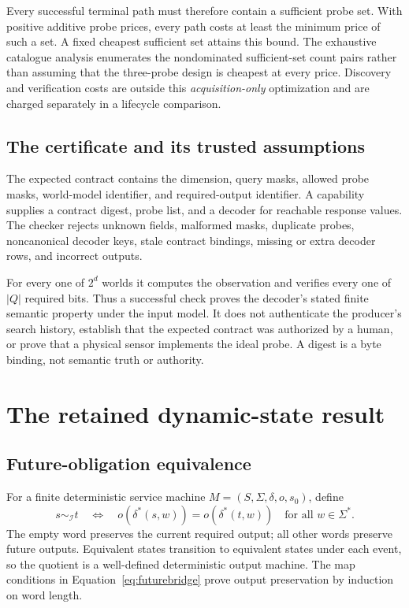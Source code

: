 \documentclass[11pt,letterpaper]{article}
\newcommand{\I}{\mathcal I}\newcommand{\A}{\mathcal A}
\theoremstyle{remark}\newtheorem{remark}{Remark}[section]
\begin{document}
Every successful terminal path must therefore contain a sufficient probe set. With positive additive probe prices, every path costs at least the minimum price of such a set. A fixed cheapest sufficient set attains this bound. The exhaustive catalogue analysis enumerates the nondominated sufficient-set count pairs rather than assuming that the three-probe design is cheapest at every price. Discovery and verification costs are outside this \emph{acquisition-only} optimization and are charged separately in a lifecycle comparison.

\subsection{The certificate and its trusted assumptions}
The expected contract contains the dimension, query masks, allowed probe masks, world-model identifier, and required-output identifier. A capability supplies a contract digest, probe list, and a decoder for reachable response values. The checker rejects unknown fields, malformed masks, duplicate probes, noncanonical decoder keys, stale contract bindings, missing or extra decoder rows, and incorrect outputs.

For every one of $2^d$ worlds it computes the observation and verifies every one of $|Q|$ required bits. Thus a successful check proves the decoder's stated finite semantic property under the input model. It does not authenticate the producer's search history, establish that the expected contract was authorized by a human, or prove that a physical sensor implements the ideal probe. A digest is a byte binding, not semantic truth or authority.

\section{The retained dynamic-state result}\label{app:legacy}
\subsection{Future-obligation equivalence}
For a finite deterministic service machine $M=(S,\Sigma,\delta,o,s_0)$, define
\begin{equation}
 s\sim_{\I}t\quad\Longleftrightarrow\quad
 o(\delta^*(s,w))=o(\delta^*(t,w))\quad\text{for all }w\in\Sigma^*.
\end{equation}
The empty word preserves the current required output; all other words preserve future outputs. Equivalent states transition to equivalent states under each event, so the quotient is a well-defined deterministic output machine. The map conditions in Equation~\eqref{eq:futurebridge} prove output preservation by induction on word length.
\end{document}
